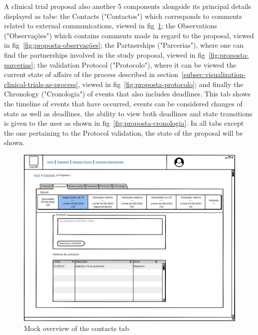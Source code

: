 A clinical trial proposal also another 5 components alongside its principal details displayed as tabs: the Contacts ("Contactos") which corresponds to comments related to external communications, viewed in fig~\ref{fig:proposta-contactos}; the Observations ("Observações") which contains comments made in regard to the proposal, viewed in fig~\ref{fig:proposta-observações}; the Partnerships ("Parcerias"), where one can find the partnerships involved in the study proposal, viewed in fig~\ref{fig:proposta-parcerias}; the validation Protocol ("Protocolo"), where it can be viewed the current state of affairs of the process described in section~\ref{subsec:visualization-clinical-trials-as-process}, viewed in fig~\ref{fig:proposta-protocolo}; and finally the Chronology ("Cronologia") of events that also includes deadlines. This tab shows the timeline of events that have occurred, events can be considered changes of state as well as deadlines, the ability to view both deadlines and state transitions is given to the user as shown in fig~\ref{fig:proposta-cronologia}. In all tabs except the one pertaining to the Protocol validation, the state of the proposal will be shown.

\begin{figure}[H]
    \centering
    \includegraphics[scale=0.35]{images/proposta-contactos.png}
    \caption{Mock overview of the contacts tab}
    \label{fig:proposta-contactos}
\end{figure}

